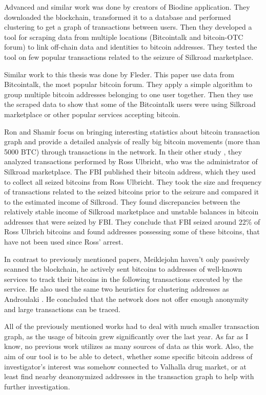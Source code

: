 \documentclass[
  digital, %
  table,   %
  lof,     %
  lot,     %
  oneside
]{fithesis3}
\begin{document}
Advanced and similar work \cite{spagnuolo2014bitiodine} was done by creators of Biodine application. They downloaded the blockchain, transformed it to
 a database and performed clustering to get a graph of transactions between users.
Then they developed a tool for scraping data from multiple locations (Bitcointalk and bitcoin-OTC forum) to link
off-chain data and identities to bitcoin addresses.
They tested the tool on few popular transactions related to the seizure of Silkroad marketplace.

Similar work \cite{fleder2015bitcoin} to this thesis was done by Fleder.
This paper use data from Bitcointalk, the most popular bitcoin forum. 
They apply a simple algorithm to group multiple bitcoin addresses belonging to one user together.
Then they use the scraped data to show
that some of the Bitcointalk users were using Silkroad marketplace or other popular services accepting bitcoin.
 
Ron and Shamir \cite{ron2013quantitative} focus on bringing
interesting statistics about bitcoin transaction graph
and provide a detailed analysis of really big bitcoin movements (more than 5000 BTC) 
through transactions in the network.
In their other study \cite{ron2014did}, they analyzed transactions performed by Ross Ulbricht,
who was the administrator of Silkroad marketplace.
The FBI published their bitcoin address, which they used to collect all seized bitcoins from Ross Ulbricht.
They took the size and frequency of transactions related to the seized bitcoins prior to the seizure and compared it to the estimated income of Silkroad. They found discrepancies between the 
relatively stable income of Silkroad marketplace and unstable balances in bitcoin addresses
that were seized by FBI. They conclude that FBI seized around 22\% of Ross Ulbrich bitcoins
and found addresses possessing some of these bitcoins, that have not been used since Ross' arrest.

In contrast to previously mentioned papers, Meiklejohn \cite{meiklejohn2013fistful} 
haven't only passively scanned the blockchain, he actively sent bitcoins to addresses of
well-known services to track their bitcoins in the following transactions executed by the service.
He also used the same two heuristics for clustering addresses
as Androulaki \cite{androulaki2013evaluating}.
He concluded that the network does not offer enough anonymity and large transactions can be traced.

All of the previously mentioned works had to deal with much smaller transaction graph,
as the usage of bitcoin grew significantly over the last year. 
As far as I know,
no previous work utilizes as many sources of data as this work.
Also, the aim of our tool is to be able to detect, whether some specific bitcoin address of 
investigator's interest was somehow connected to Valhalla drug market, or at least find nearby
deanonymized addresses in the transaction graph to help with further investigation.
\end{document}
